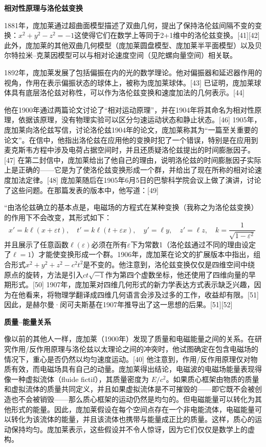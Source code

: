 \textbf{相对性原理与洛伦兹变换 }

1881年，庞加莱通过超曲面模型描述了双曲几何，提出了保持洛伦兹间隔不变的变换：\(x^2 + y^2 - z^2 = -1\)这使得它们在数学上等同于2+1维中的洛伦兹变换。[41][42] 此外，庞加莱的其他双曲几何模型（庞加莱圆盘模型、庞加莱半平面模型）以及贝尔特拉米–克莱因模型可以与相对论速度空间（见陀螺向量空间）相关联。

1892年，庞加莱发展了包括偏振在内的光的数学理论。他对偏振器和延迟器作用的视角，作用在表示偏振状态的球体上，被称为庞加莱球体。[43] 已证明，庞加莱球体具有底层洛伦兹对称性，可以作为洛伦兹变换和速度加法的几何表示。[44]

他在1900年通过两篇论文讨论了“相对运动原理”，并在1904年将其命名为相对性原理，依据该原理，没有物理实验可以区分匀速运动状态和静止状态。[46] 1905年，庞加莱向洛伦兹写信，讨论洛伦兹1904年的论文，庞加莱称其为“一篇至关重要的论文”。在信中，他指出洛伦兹在应用他的变换时犯了一个错误，特别是在应用到麦克斯韦方程中涉及电荷占据空间时，并且还质疑洛伦兹提出的时间膨胀因子。[47] 在第二封信中，庞加莱给出了他自己的理由，说明洛伦兹的时间膨胀因子实际上是正确的——它是为了使洛伦兹变换形成一个群，并给出了现在所称的相对论速度加法定律。[48] 庞加莱随后在1905年6月5日的巴黎科学院会议上做了演讲，讨论了这些问题。在那篇发表的版本中，他写道：[49]

“由洛伦兹确立的基本点是，电磁场的方程式在某种变换（我称之为洛伦兹变换）的作用下不会改变，其形式如下：
\[
x' = k\ell (x + \varepsilon t), \quad t' = k\ell (t + \varepsilon x), \quad y' = \ell y, \quad z' = \ell z, \quad k = \frac{1}{\sqrt{1-\varepsilon^2}}~
\]
并且展示了任意函数\(\ell(\varepsilon)\)必须在所有\(\varepsilon\)下为常数1（洛伦兹通过不同的理由设定了\(\ell = 1\)）才能使变换形成一个群。1906年，庞加莱在论文的扩展版本中指出，组合形式\(x^2 + y^2 + z^2 - c^2 t^2\)是不变的。他注意到，洛伦兹变换仅仅是四维空间中绕原点的旋转，方法是引入\(ct\sqrt{-1}\)作为第四个虚数坐标，他还使用了四维向量的早期形式。[50] 1907年，庞加莱对四维几何形式的新力学表达方式表示缺乏兴趣，因为在他看来，将物理学翻译成四维几何语言会涉及过多的工作，收益却有限。[51] 因此，是赫尔曼·闵可夫斯基在1907年推导出了这一思想的后果。[51][52]

\textbf{质量–能量关系}  

像以前的其他人一样，庞加莱（1900年）发现了质量和电磁能量之间的关系。在研究作用/反作用原理与洛伦兹以太理论之间的冲突时，他试图确定在包含电磁场的情况下，重心是否仍然以均匀速度运动。[40] 他注意到，作用/反作用原理仅对物质有效，而电磁场具有自己的动量。庞加莱得出结论，电磁波的电磁场能量表现得像一种虚拟流体（fluide fictif），其质量密度为 \( E/c^2 \)。如果质心框架由物质的质量和虚拟流体的质量共同定义，并且如果虚拟流体是不可摧毁的——即它既不会被创造也不会被销毁——那么质心框架的运动仍然是均匀的。但电磁能量可以转化为其他形式的能量。因此，庞加莱假设在每个空间点存在一个非电能流体，电磁能量可以转化为该流体的能量，并且该流体也携带与能量成正比的质量。这样，质心的运动保持均匀。庞加莱表示，这些假设并不令人惊讶，因为它们仅仅是数学上的虚构。


